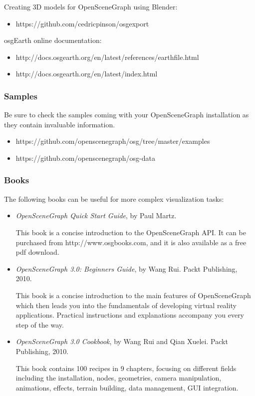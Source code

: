Creating 3D models for OpenSceneGraph using Blender:
\begin{itemize}
\item https://github.com/cedricpinson/osgexport
\end{itemize}

osgEarth online documentation:
\begin{itemize}
\item http://docs.osgearth.org/en/latest/references/earthfile.html
\item http://docs.osgearth.org/en/latest/index.html
\end{itemize}

\subsubsection{Samples}
\label{sec:graphics:osg-osgearth-samples}

Be sure to check the samples coming with your OpenSceneGraph installation as
they contain invaluable information.
\begin{itemize}
\item https://github.com/openscenegraph/osg/tree/master/examples
\item https://github.com/openscenegraph/osg-data
\end{itemize}

\subsubsection{Books}
\label{sec:graphics:osg-osgearth-books}

The following books can be useful for more complex visualization tasks:

\begin{itemize}
\item \textit{OpenSceneGraph Quick Start Guide}, by Paul Martz.

This book is a concise introduction to the OpenSceneGraph API. It can be
purchased from http://www.osgbooks.com, and it is also available as
a free pdf download.

\item \textit{OpenSceneGraph 3.0: Beginners Guide}, by Wang Rui. Packt Publishing, 2010.

This book is a concise introduction to the main features of OpenSceneGraph
which then leads you into the fundamentals of developing virtual reality
applications. Practical instructions and explanations accompany you every
step of the way.

\item \textit{OpenSceneGraph 3.0 Cookbook}, by Wang Rui and Qian Xuelei. Packt Publishing, 2010.

This book contains 100 recipes in 9 chapters, focusing on different
fields including the installation, nodes, geometries, camera manipulation,
animations, effects, terrain building, data management, GUI integration.

\end{itemize}


